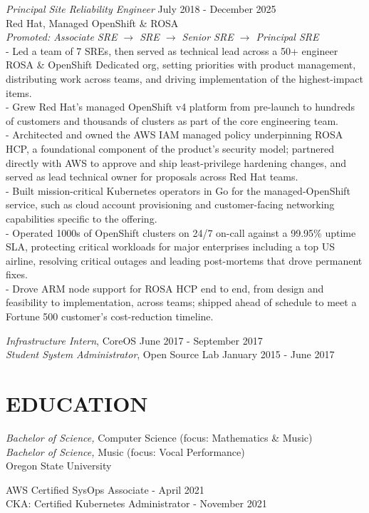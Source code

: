 \documentclass[line,margin]{res}
\begin{document}
\begin{resume}
                    {\sl Principal Site Reliability Engineer} \hfill July 2018 - December 2025\\
                    Red Hat, Managed OpenShift \& ROSA\\
                    {\sl Promoted: Associate SRE $\rightarrow$ SRE $\rightarrow$ Senior SRE $\rightarrow$ Principal SRE}\\
                    - Led a team of 7 SREs, then served as technical lead across a 50+ engineer ROSA \& OpenShift Dedicated org, setting priorities with product management, distributing work across teams, and driving implementation of the highest-impact items.\\
                    - Grew Red Hat's managed OpenShift v4 platform from pre-launch to hundreds of customers and thousands of clusters as part of the core engineering team.\\
                    - Architected and owned the AWS IAM managed policy underpinning ROSA HCP, a foundational component of the product's security model; partnered directly with AWS to approve and ship least-privilege hardening changes, and served as lead technical owner for proposals across Red Hat teams.\\
                    - Built mission-critical Kubernetes operators in Go for the managed-OpenShift service, such as cloud account provisioning and customer-facing networking capabilities specific to the offering.\\
                    - Operated 1000s of OpenShift clusters on 24/7 on-call against a 99.95\% uptime SLA, protecting critical workloads for major enterprises including a top US airline, resolving critical outages and leading post-mortems that drove permanent fixes.\\
                    - Drove ARM node support for ROSA HCP end to end, from design and feasibility to implementation, across teams; shipped ahead of schedule to meet a Fortune 500 customer's cost-reduction timeline.

                    {\sl Infrastructure Intern}, CoreOS \hfill June 2017 - September 2017\\
                    {\sl Student System Administrator}, Open Source Lab \hfill January 2015 - June 2017

\newpage

\section{EDUCATION}
                    {\sl Bachelor of Science,} Computer Science (focus: Mathematics \& Music) \\
                    {\sl Bachelor of Science,} Music (focus: Vocal Performance) \\
                    Oregon State University

                    AWS Certified SysOps Associate - April 2021 \\
                    CKA: Certified Kubernetes Administrator - November 2021
                   
\end{resume}
\end{document}
